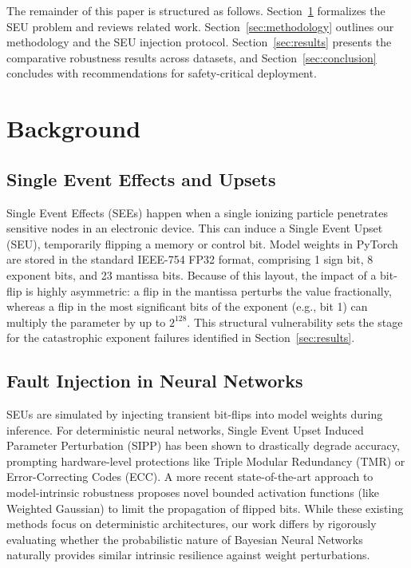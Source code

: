 \documentclass[a4paper,twoside]{article}
\begin{document}
The remainder of this paper is structured as follows. Section~\ref{sec:relatedwork} formalizes the SEU problem and reviews related work. Section~\ref{sec:methodology} outlines our methodology and the SEU injection protocol. Section~\ref{sec:results} presents the comparative robustness results across datasets, and Section~\ref{sec:conclusion} concludes with recommendations for safety-critical deployment.

\section{Background}
\label{sec:relatedwork}

\subsection{Single Event Effects and Upsets}
Single Event Effects (SEEs) happen when a single ionizing particle penetrates sensitive nodes in an electronic device. This can induce a Single Event Upset (SEU), temporarily flipping a memory or control bit. Model weights in PyTorch are stored in the standard IEEE-754 FP32 format, comprising 1 sign bit, 8 exponent bits, and 23 mantissa bits. Because of this layout, the impact of a bit-flip is highly asymmetric: a flip in the mantissa perturbs the value fractionally, whereas a flip in the most significant bits of the exponent (e.g., bit 1) can multiply the parameter by up to $2^{128}$. This structural vulnerability sets the stage for the catastrophic exponent failures identified in Section~\ref{sec:results}.

\subsection{Fault Injection in Neural Networks}
SEUs are simulated by injecting transient bit-flips into model weights during inference. For deterministic neural networks, Single Event Upset Induced Parameter Perturbation (SIPP) has been shown to drastically degrade accuracy, prompting hardware-level protections like Triple Modular Redundancy (TMR) or Error-Correcting Codes (ECC). A more recent state-of-the-art approach to model-intrinsic robustness proposes novel bounded activation functions (like Weighted Gaussian) to limit the propagation of flipped bits. While these existing methods focus on deterministic architectures, our work differs by rigorously evaluating whether the probabilistic nature of Bayesian Neural Networks naturally provides similar intrinsic resilience against weight perturbations.
\end{document}
